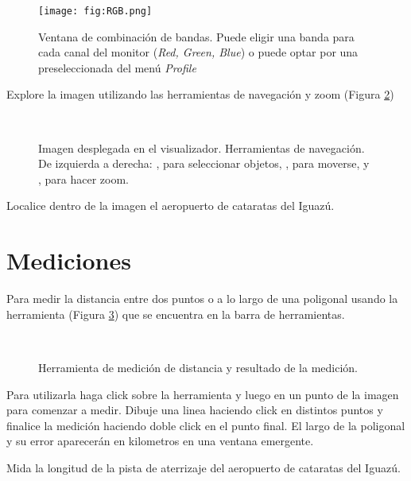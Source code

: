 \begin{figure}[h!]
    \centering
    \texttt{[image: fig:RGB.png]}
    \caption{Ventana de combinación de bandas. Puede eligir una banda para cada canal del monitor (\emph{Red, Green, Blue}) o puede optar por una preseleccionada del menú \emph{Profile}}
    \label{fig:RGB}
\end{figure}

Explore la imagen utilizando las herramientas de navegación y zoom (Figura \ref{fig:mono})

\begin{figure}[h!]
    \centering
    \\
    \caption{Imagen desplegada en el visualizador. Herramientas de navegación. De izquierda a derecha: , para seleccionar objetos, , para moverse, y , para hacer zoom.}
    \label{fig:mono}
\end{figure}

Localice dentro de la imagen el aeropuerto de cataratas del Iguazú.

\section{Mediciones}

Para medir la distancia entre dos puntos o a lo largo de una poligonal usando la herramienta  (Figura \ref{fig:distancia}) que se encuentra en la barra de herramientas.

\begin{figure}[h!]
    \centering
    \\
    \caption{Herramienta de medición de distancia  y resultado de la medición.}
    \label{fig:distancia}
\end{figure}

Para utilizarla haga click sobre la herramienta y luego en un punto de la imagen para comenzar a medir. Dibuje una linea haciendo click en distintos puntos y finalice la medición haciendo doble click en el punto final. El largo de la poligonal y su error aparecerán en kilometros en una ventana emergente.

Mida la longitud de la pista de aterrizaje del aeropuerto de cataratas del Iguazú.

